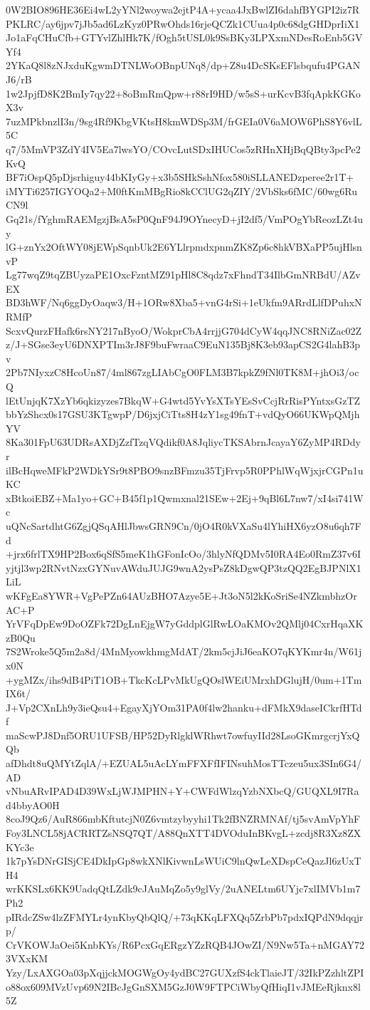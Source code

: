 0W2BIO896HE36Ei4wL2yYNl2woywa2ejtP4A+ycaa4JxBwlZI6dahfBYGPI2iz7R
PKLRC/ay6jpv7jJb5ad6LzKyz0PRwOhds16rjeQCZk1CUua4p0c68dgGHDprIiX1
Jo1aFqCHuCfb+GTYvlZhlHk7K/fOgh5tUSL0k9SsBKy3LPXxmNDesRoEnb5GVYf4
2YKaQ8l8zNJxduKgwmDTNLWoOBnpUNq8/dp+Z8u4DcSKsEFlsbqufu4PGANJ6/rB
1w2JpjfD8K2BmIy7qy22+8oBmRmQpw+r88rI9HD/w5sS+urKcvB3fqApkKGKoX3v
7uzMPkbnzlI3n/9sg4Rf9KbgVKtsH8kmWDSp3M/frGEIa0V6aMOW6PhS8Y6vlL5C
q7/5MmVP3ZdY4IV5Ea7lwsYO/COvcLutSDxIHUCos5zRHnXHjBqQBty3pcPe2KvQ
BF7iOspQ5pDjsrhiguy44bKIyGy+x3b5SHkSshNfox580iSLLANEDzperee2r1T+
iMYTi6257IGYOQa2+M0ftKmMBgRio8kCClUG2qZIY/2VbSks6fMC/60wg6RuCN9l
Gq21s/fYghmRAEMgzjBsA5sP0QnF94J9OYnecyD+jI2df5/VmPOgYbReozLZt4uy
lG+znYx2OftWY08jEWpSqnbUk2E6YLlrpmdxpnmZK8Zp6c8hkVBXaPP5ujHlsnvP
Lg77wqZ9tqZBUyzaPE1OxcFzntMZ91pHl8C8qdz7xFhndT34IlbGmNRBdU/AZvEX
BD3hWF/Nq6ggDyOaqw3/H+1ORw8Xba5+vnG4rSi+1eUkfm9ARrdLlfDPuhxNRMfP
ScxvQurzFHafk6rsNY217nByoO/WokprCbA4rrjjG704dCyW4qqJNC8RNiZac02Z
z/J+SGse3eyU6DNXPTIm3rJ8F9buFwraaC9EuN135Bj8K3eb93apCS2G4lahB3pv
2Pb7NIyxzC8HcoUn87/4ml867zgLIAbCgO0FLM3B7kpkZ9fNl0TK8M+jhOi3/ocQ
lEtUnjqK7XzYb6qkizyzes7BkqW+G4wtd5YvYsXTsYEsSvCcjRrRisPYntxsGzTZ
bbYzShcx0s17GSU3KTgwpP/D6jxjCiTts8H4zY1sg49fnT+vdQyO66UKWpQMjhYV
8Ka301FpU63UDRsAXDjZzfTzqVQdikf0A8JqliycTKSAbrnJcayaY6ZyMP4RDdyr
ilBcHqweMFkP2WDkYSr9t8PBO9snzBFmzu35TjFrvp5R0PPhlWqWjxjrCGPn1uKC
xBtkoiEBZ+Ma1yo+GC+B45f1p1Qwmxnal21SEw+2Ej+9qBl6L7nw7/xI4si741Wc
uQNcSartdhtG6ZgjQSqAHlJbwsGRN9Cn/0jO4R0kVXaSu4lYhiHX6yzO8u6qh7Fd
+jrx6frlTX9HP2Box6qSfS5meK1hGFonIcOo/3hlyNfQDMv5I0RA4Eo0RmZ37v6I
yjtjl3wp2RNvtNzxGYNuvAWduJUJG9wnA2ysPsZ8kDgwQP3tzQQ2EgBJPNlX1LiL
wKFgEa8YWR+VgPePZn64AUzBHO7Azye5E+Jt3oN5l2kKoSriSe4NZkmbhzOrAC+P
YrVFqDpEw9DoOZFk72DgLnEjgW7yGddplGlRwLOaKMOv2QMlj04CxrHqaXKzB0Qu
7S2Wroke5Q5m2a8d/4MnMyowkhmgMdAT/2km5cjJiJ6eaKO7qKYKmr4n/W61jx0N
+ygMZx/ihs9dB4PiT1OB+TkcKcLPvMkUgQOslWEiUMrxhDGlujH/0um+1TmIX6t/
J+Vp2CXnLh9y3ieQsu4+EgayXjYOm31PA0f4lw2hanku+dFMkX9daseICkrfHTdf
maScwPJ8Dnf5ORU1UFSB/HP52DyRlgklWRhwt7owfuyIId28LsoGKmrgcrjYxQQb
afDhdt8uQMYtZqlA/+EZUAL5uAcLYmFFXFfIFINsuhMosTTczeu5ux3SIn6G4/AD
vNbuARvIPAD4D39WxLjWJMPHN+Y+CWFdWlzqYzbNXbcQ/GUQXL9I7Rad4bbyAO0H
8coJ9Qz6/AuR866mbKftutcjN0Z6vmtzybyyhi1Tk2fBNZRMNAf/tj5svAmVpYhF
Foy3LNCL58jACRRTZsNSQ7QT/A88QnXTT4DVOduInBKvgL+zcdj8R3Xz8ZXKYc3e
1k7pYsDNrGISjCE4DkIpGp8wkXNlKivwnLsWUiC9lnQwLeXDspCeQazJl6zUxTH4
wrKKSLx6KK9UadqQtLZdk9cJAuMqZo5y9glVy/2uANELtm6UYjc7xlIMVb1m7Ph2
pIRdcZSw4lzZFMYLr4ynKbyQbQlQ/+73qKKqLFXQq5ZrbPb7pdxIQPdN9dqqjrp/
CrVKOWJaOei5KnbKYs/R6PcxGqERgzYZzRQB4JOwZI/N9Nw5Ta+nMGAY723VXxKM
Yzy/LxAXGOa03pXqjjckMOGWgOy4ydBC27GUXzfS4ckTlaieJT/32IkPZzhltZPI
o88ox609MVzUvp69N2IBcJgGnSXM5GzJ0W9FTPCiWbyQfHiqI1vJMEeRjknx8l5Z
